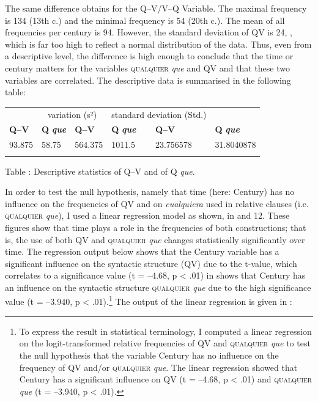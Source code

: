 \documentclass[output=paper]{langscibook}
\begin{document}
  The same difference obtains for the Q–V/V–Q Variable. The maximal frequency is 134 (13th c.) and the minimal frequency is 54 (20th c.). The mean of all frequencies per century is 94. However, the standard deviation of QV is 24, , which is far too high to reflect a normal distribution of the data. Thus, even from a descriptive level, the difference is high enough to conclude that the time or century matters for the variables \textsc{qualquier} \textit{que} and QV and that these two variables are correlated. The descriptive data is summarised in the following table:


\begin{tabularx}{\textwidth}{XXXXXX}

\lsptoprule

\multicolumn{2}{c}{ mean} & \multicolumn{2}{c}{ variation (s²)} & \multicolumn{2}{c}{ standard deviation (Std.)}\\
 \textbf{Q–V} & \textbf{Q} \textbf{\textit{que}} & \textbf{Q–V} & \textbf{Q} \textbf{\textit{que}} & \textbf{Q–V} & \textbf{Q} \textbf{\textit{que}}\\
 93.875 & 58.75 & 564.375 & 1011.5 & 23.756578 & 31.8040878\\
\lspbottomrule
\end{tabularx}
Table : Descriptive statistics of Q–V and of Q \textit{que}.

In order to test the null hypothesis, namely that time (here: Century) has no influence on the frequencies of QV and on \textit{cualquiera} used in relative clauses (i.e. \textsc{qualquier} \textit{que}), I used a linear regression model as shown, in  and 12. These figures show that time plays a role in the frequencies of both constructions; that is, the use of both QV and \textsc{qualquier} \textit{que} changes statistically significantly over time. The regression output below shows that the Century variable has a significant influence on the syntactic structure (QV) due to the t-value, which correlates to a significance value (t = –4.68, p < .01) in  shows that Century has an influence on the syntactic structure \textsc{qualquier} \textit{que} due to the high significance value (t = –3.940, p < .01).\footnote{ \textrm{To express the result in statistical terminology, I computed a linear regression on the logit-transformed relative frequencies of QV and} \textsc{qualquier}\textrm{ \textit{que}} \textrm{to test the null hypothesis that the variable Century has no influence on the frequency of QV and/or} \textsc{qualquier} \textrm{\textit{que}}\textrm{. The linear regression showed that Century has a significant influence on QV (t = –4.68, p < .01) and} \textsc{qualquier} \textrm{\textit{que}} \textrm{(t = –3.940, p < .01).}} The output of the linear regression is given in :
\end{document}
